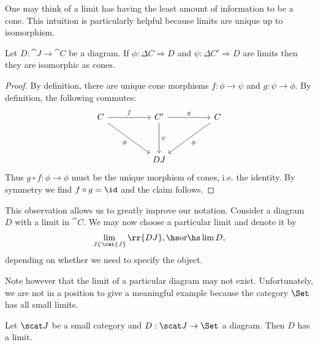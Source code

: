 \documentclass{article}
\begin{document}
One may think of a limit has having the least amount of information to be a cone.
This intuition is particularly helpful because limits are unique up to isomorphism.

\begin{proposition}\label{prop:limits_are_unique}
  Let $D:\cat{J}\to\cat{C}$ be a diagram. If $\phi:\Delta C\Rightarrow D$
  and $\psi:\Delta C'\Rightarrow D$ are limits then they are isomorphic as cones.
  \begin{proof}
    By definition, there are unique cone morphisms $f:\phi\to\psi$ and
    $g:\psi\to\phi$. By definition, the following commutes:
    \begin{equation}
      \begin{tikzcd}
        C && {C'} && C \\
        \\
          && DJ
          \arrow["f", from=1-1, to=1-3]
          \arrow["\psi", from=1-3, to=3-3]
          \arrow["\phi"', from=1-1, to=3-3]
          \arrow["\phi", from=1-5, to=3-3]
          \arrow["g", from=1-3, to=1-5]
      \end{tikzcd}
    \end{equation}
    Thus $g\circ f:\phi\to\phi$ must be the unique morphism of cones, i.e.
    the identity. By symmetry we find $f\circ g=\id$ and the claim follows.
  \end{proof}
\end{proposition}

\begin{notation}
  This observation allows us to greatly improve our notation. Consider a diagram
  $D$ with a limit in $\cat{C}$. We may now choose a particular limit and denote
  it by
  \begin{align*}
    \lim_{J\in\cat{J}}\rr{DJ},\hs\text{or}\hs\lim D,
  \end{align*}
  depending on whether we need to specify the object.
\end{notation}

Note however that the limit of a particular diagram may not exist. Unfortunately, we
are not in a position to give a meaningful example because the category $\Set$ has
all small limits.

\begin{theorem}
  Let $\scat J$ be a small category and $D:\scat J\to\Set$ a diagram. Then $D$ has a limit.
\end{theorem}
\end{document}
